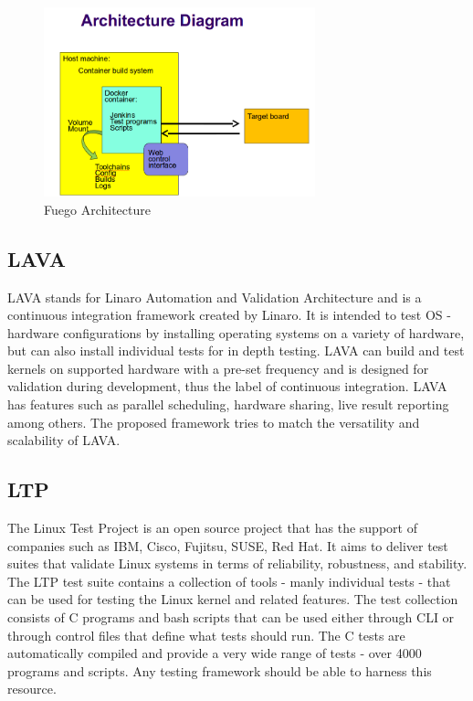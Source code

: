 \begin{figure}[h!]
  \centering
	\includegraphics[width=0.7\textwidth]{images/fuego-arch.png}
    \caption{Fuego Architecture}
\end{figure}

\subsection{LAVA}

LAVA stands for Linaro Automation and Validation Architecture and is a continuous integration framework created by Linaro. It is intended to test OS - hardware configurations by installing operating systems on a variety of hardware, but can also install individual tests for in depth testing. LAVA can build and test kernels on supported hardware with a pre-set frequency and is designed for validation during development, thus the label of continuous integration. LAVA has features such as parallel scheduling, hardware sharing, live result reporting among others. The proposed framework tries to match the versatility and scalability of LAVA. 
\subsection{LTP}

The Linux Test Project is an open source project that has the support of companies such as IBM, Cisco, Fujitsu, SUSE, Red Hat. It aims to deliver test suites that validate Linux systems in terms of reliability, robustness, and stability. The LTP test suite contains a collection of tools - manly individual tests - that can be used for testing the Linux kernel and related features. The test collection consists of C programs and bash scripts that can be used either through CLI or through control files that define what tests should run. The C tests are automatically compiled and provide a very wide range of tests - over 4000 programs and scripts. Any testing framework should be able to harness this resource.

